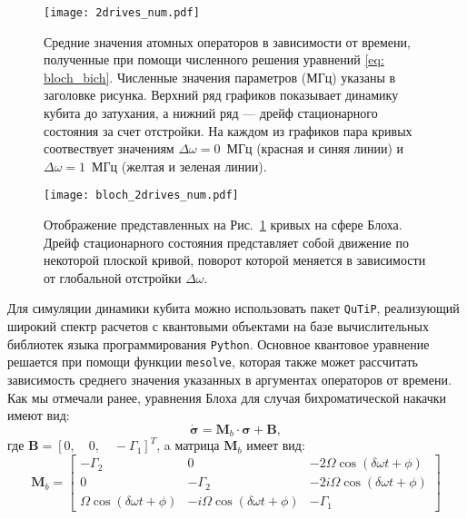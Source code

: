 \begin{figure}[h]\label{fig: num_bich}
\centering
\texttt{[image: 2drives\_num.pdf]}
\caption[Численное решение уравнений Блоха для двухуровневой системы для случая бихроматической накачки]{Средние значения атомных операторов в зависимости от времени, полученные при помощи численного решения уравнений \eqref{eq: bloch_bich}. Численные значения параметров (МГц) указаны в заголовке рисунка. Верхний ряд графиков показывает динамику кубита до затухания, а нижний ряд --- дрейф стационарного состояния за счет отстройки. На каждом из графиков пара кривых соотвествует значениям $\Delta\omega=0$~МГц (красная и синяя линии) и $\Delta\omega=1$~МГц (желтая и зеленая линии).}
\end{figure}
\begin{figure}[t]\label{fig: bloch_num_bich}
	\centering
	\texttt{[image: bloch\_2drives\_num.pdf]}
	\caption[Представление численное решение уравнений Блоха для случая бихроматической накачки на сфере Блоха]{Отображение представленных на Рис.~\ref{fig: num_bich} кривых на сфере Блоха. Дрейф стационарного состояния представляет собой движение по некоторой плоской кривой, поворот которой меняется в зависимости от глобальной отстройки $\Delta\omega$.}
\end{figure}
Для симуляции динамики кубита можно использовать пакет \verb|QuTiP|, реализующий широкий спектр расчетов с квантовыми объектами на базе вычислительных библиотек языка программирования \verb|Python|. Основное квантовое уравнение решается при помощи функции \verb|mesolve|, которая также может рассчитать зависимость среднего значения указанных в аргументах операторов от времени. Как мы отмечали ранее, уравнения Блоха для случая бихроматической накачки имеют вид:
\begin{equation} \label{eq: bloch_bich}
	\dot{\boldsymbol{\sigma}} =\mathbf{M}_b\cdot \boldsymbol{\sigma} + \mathbf{B},
\end{equation} где $\mathbf{B} = [0,\quad 0, \quad-\Gamma_1]^{T}$, a матрица $\mathbf{M}_b$ имеет вид:
\begin{equation}\label{eq: bloch_bich}
	\mathbf{M}_b = \left[\begin{matrix}- {\Gamma}_{2}  & 0 & - 2 \Omega \cos{\left(\delta\omega t + \phi \right)}\\0 & - \Gamma_{2} & - 2 i \Omega \cos{\left(\delta\omega t + \phi \right)}\\\Omega \cos{\left(\delta\omega t + \phi \right)} & - i \Omega \cos{\left(\delta\omega t + \phi \right)} & - \Gamma_1\end{matrix}\right]
\end{equation}
